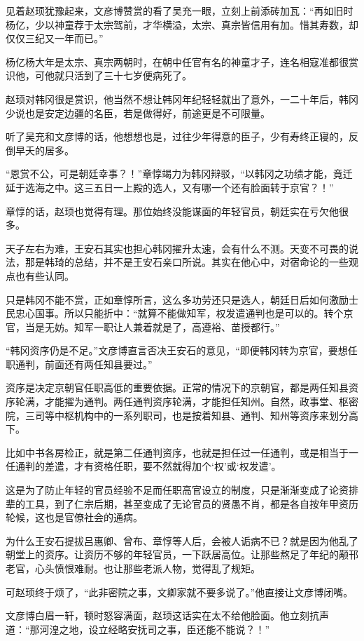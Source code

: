 见着赵顼犹豫起来，文彦博赞赏的看了吴充一眼，立刻上前添砖加瓦：“再如旧时杨亿，少以神童荐于太宗驾前，才华横溢，太宗、真宗皆信用有加。惜其寿数，却仅仅三纪又一年而已。”

杨亿杨大年是太宗、真宗两朝时，在朝中任官有名的神童才子，连名相寇准都很赏识他，可他就只活到了三十七岁便病死了。

赵顼对韩冈很是赏识，他当然不想让韩冈年纪轻轻就出了意外，一二十年后，韩冈少说也是安定边疆的名臣，若是做得好，前途更是不可限量。

听了吴充和文彦博的话，他想想也是，过往少年得意的臣子，少有寿终正寝的，反倒早夭的居多。

“恩赏不公，可是朝廷幸事？！”章惇竭力为韩冈辩驳，“以韩冈之功绩才能，竟迁延于选海之中。这三五日一上殿的选人，又有哪一个还有脸面转于京官？！”

章惇的话，赵顼也觉得有理。那位始终没能谋面的年轻官员，朝廷实在亏欠他很多。

天子左右为难，王安石其实也担心韩冈擢升太速，会有什么不测。天变不可畏的说法，那是韩琦的总结，并不是王安石亲口所说。其实在他心中，对宿命论的一些观点也有些认同。

只是韩冈不能不赏，正如章惇所言，这么多功劳还只是选人，朝廷日后如何激励士民忠心国事。所以只能折中：“就算不能做知军，权发遣通判也是可以的。转个京官，当是无妨。知军一职让人兼着就是了，高遵裕、苗授都行。”

“韩冈资序仍是不足。”文彦博直言否决王安石的意见，“即便韩冈转为京官，要想任职通判，前面还有两任知县要过。”

资序是决定京朝官任职高低的重要依据。正常的情况下的京朝官，都是两任知县资序轮满，才能擢为通判。两任通判资序轮满，才能担任知州。自然，政事堂、枢密院，三司等中枢机构中的一系列职司，也是按着知县、通判、知州等资序来划分高下。

比如中书各房检正，就是第二任通判资序，也就是担任过一任通判，或是相当于一任通判的差遣，才有资格任职，要不然就得加个‘权’或‘权发遣’。

这是为了防止年轻的官员经验不足而任职高官设立的制度，只是渐渐变成了论资排辈的工具，到了仁宗后期，甚至变成了无论官员的贤愚不肖，都是各自按年甲资历轮候，这也是官僚社会的通病。

为什么王安石提拔吕惠卿、曾布、章惇等人后，会被人诟病不已？就是因为他乱了朝堂上的资序。让资历不够的年轻官员，一下跃居高位。让那些熬足了年纪的颟邗老官，心头愤恨难耐。也让那些老派人物，觉得乱了规矩。

可赵顼终于烦了，“此非密院之事，文卿家就不要多说了。”他直接让文彦博闭嘴。

文彦博白眉一轩，顿时怒容满面，赵顼这话实在太不给他脸面。他立刻抗声道：“那河湟之地，设立经略安抚司之事，臣还能不能说？！”

